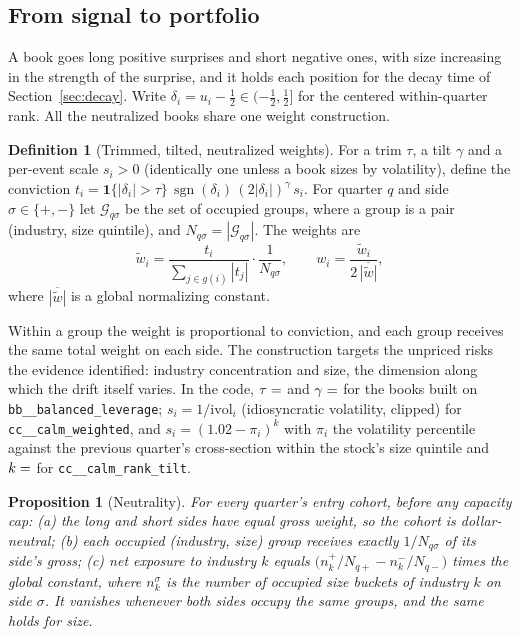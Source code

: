 \documentclass[11pt]{article}
\makeatletter
\newtheorem{proposition}{Proposition}
\theoremstyle{definition}
\newtheorem{definition}{Definition}
\newcommand{\sgn}{\operatorname{sgn}}
\newcommand{\1}{\mathbf{1}}
\newcommand{\sn}[1]{\texttt{\sn@scan#1\@nil}}
\def\sn@scan#1{\ifx#1\@nil\else\ifx#1_\_\allowbreak\else#1\fi\expandafter\sn@scan\fi}
\makeatother
\begin{document}
\subsection{From signal to portfolio}

A book goes long positive surprises and short negative ones, with size increasing in the strength of
the surprise, and it holds each position for the decay time of Section~\ref{sec:decay}. Write
$\delta_i=u_i-\tfrac12\in(-\tfrac12,\tfrac12]$ for the centered within-quarter rank. All the neutralized
books share one weight construction.

\begin{definition}[Trimmed, tilted, neutralized weights]\label{def:weights}
For a trim $\tau$, a tilt $\gamma$ and a per-event scale $s_i>0$ (identically one unless a book sizes by
volatility), define the conviction
$t_i=\1\{|\delta_i|>\tau\}\,\sgn(\delta_i)\,(2|\delta_i|)^{\gamma}\,s_i$. For quarter $q$ and side
$\sigma\in\{+,-\}$ let $\mathcal{G}_{q\sigma}$ be the set of occupied groups, where a group is a pair
(industry, size quintile), and $N_{q\sigma}=|\mathcal G_{q\sigma}|$. The weights are
\begin{equation}
  \tilde w_i=\frac{t_i}{\sum_{j\in g(i)}|t_j|}\cdot\frac{1}{N_{q\sigma}},\qquad
  w_i=\frac{\tilde w_i}{2\,\overline{|\tilde w|}},
  \label{eq:weights}
\end{equation}
where $\overline{|\tilde w|}$ is a global normalizing constant.
\end{definition}

Within a group the weight is proportional to conviction, and each group receives the same total
weight on each side. The construction targets the unpriced risks the evidence identified: industry
concentration and size, the dimension along which the drift itself varies. In the code, $\tau=\stv{balanced_leverage.trim}$ and
$\gamma=\stv{balanced_leverage.tilt}$ for the books built on \sn{balanced_leverage}; $s_i=1/\mathrm{ivol}_i$
(idiosyncratic volatility, clipped) for \sn{calm_weighted}, and $s_i=(1.02-\pi_i)^{k}$ with $\pi_i$ the
volatility percentile against the previous quarter's cross-section within the stock's size quintile and
$k=\stv{calm_rank_tilt.power}$ for \sn{calm_rank_tilt}.

\begin{proposition}[Neutrality]\label{prop:neutral}
For every quarter's entry cohort, before any capacity cap:
(a) the long and short sides have equal gross weight, so the cohort is dollar-neutral;
(b) each occupied (industry, size) group receives exactly $1/N_{q\sigma}$ of its side's gross;
(c) net exposure to industry $k$ equals $\big(n^{+}_{k}/N_{q+}-n^{-}_{k}/N_{q-}\big)$ times the global
constant, where $n^\sigma_k$ is the number of occupied size buckets of industry $k$ on side $\sigma$. It
vanishes whenever both sides occupy the same groups, and the same holds for size.
\end{proposition}
\end{document}

